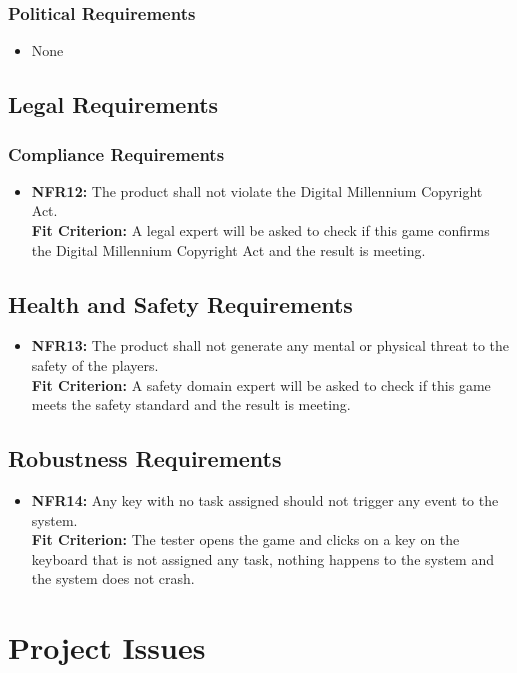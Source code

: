\documentclass[12pt, titlepage]{article}
\begin{document}
\subsubsection{Political Requirements}
\begin{itemize}
        \item None
\end{itemize}
\subsection{Legal Requirements}
\subsubsection{Compliance Requirements}
\begin{itemize}
        \item \textbf{NFR12:} The product shall not violate the Digital Millennium Copyright Act\cite{act}.\\
        \textbf{Fit Criterion:} A legal expert will be asked to check if this game confirms the Digital Millennium Copyright Act and the result is meeting.
\end{itemize}
\subsection{Health and Safety Requirements}
\begin{itemize}
        \item \textbf{NFR13:} The product shall not generate any mental or physical threat to the safety of the players.\\
        \textbf{Fit Criterion:} A safety domain expert will be asked to check if this game meets the safety standard and the result is meeting.
\end{itemize}
\subsection{Robustness Requirements}
\begin{itemize}
        \item \textbf{NFR14:} Any key with no task assigned should not trigger any event to the system.\\
        \textbf{Fit Criterion:} The tester opens the game and clicks on a key on the keyboard that is not assigned any task, nothing happens to the system and the system does not crash.\\
\end{itemize}
\section{Project Issues}
\end{document}
